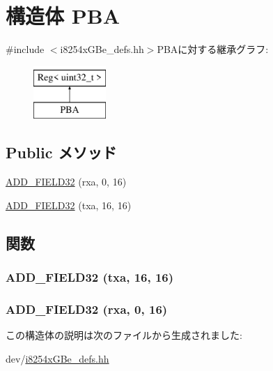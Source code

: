 \hypertarget{structiGbReg_1_1Regs_1_1PBA}{
\section{構造体 PBA}
\label{structiGbReg_1_1Regs_1_1PBA}
}


{\ttfamily \#include $<$i8254xGBe\_\-defs.hh$>$}PBAに対する継承グラフ:\begin{figure}[H]
\begin{center}
\leavevmode
\includegraphics[height=2cm]{structiGbReg_1_1Regs_1_1PBA}
\end{center}
\end{figure}
\subsection*{Public メソッド}
\begin{DoxyCompactItemize}
\item 
\hyperlink{structiGbReg_1_1Regs_1_1PBA_a3d48393b8507d5e4f7ff0861a510b3bf}{ADD\_\-FIELD32} (rxa, 0, 16)
\item 
\hyperlink{structiGbReg_1_1Regs_1_1PBA_a8970a947e22eb0852c233a83314ae29d}{ADD\_\-FIELD32} (txa, 16, 16)
\end{DoxyCompactItemize}


\subsection{関数}
\hypertarget{structiGbReg_1_1Regs_1_1PBA_a8970a947e22eb0852c233a83314ae29d}{
\subsubsection[{ADD\_\-FIELD32}]{\setlength{\rightskip}{0pt plus 5cm}ADD\_\-FIELD32 (txa, \/  16, \/  16)}}
\label{structiGbReg_1_1Regs_1_1PBA_a8970a947e22eb0852c233a83314ae29d}
\hypertarget{structiGbReg_1_1Regs_1_1PBA_a3d48393b8507d5e4f7ff0861a510b3bf}{
\subsubsection[{ADD\_\-FIELD32}]{\setlength{\rightskip}{0pt plus 5cm}ADD\_\-FIELD32 (rxa, \/  0, \/  16)}}
\label{structiGbReg_1_1Regs_1_1PBA_a3d48393b8507d5e4f7ff0861a510b3bf}


この構造体の説明は次のファイルから生成されました:\begin{DoxyCompactItemize}
\item 
dev/\hyperlink{i8254xGBe__defs_8hh}{i8254xGBe\_\-defs.hh}\end{DoxyCompactItemize}
